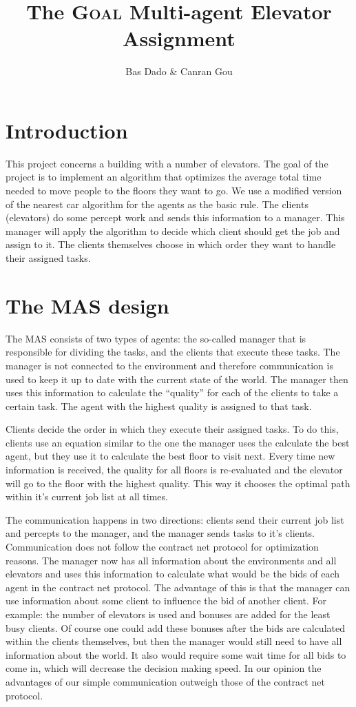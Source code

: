 \documentclass[a4paper,10pt,twocolumn]{article}
\title{The \textsc{Goal} Multi-agent Elevator Assignment}
\author{Bas Dado \& Canran Gou}
\begin{document}
\maketitle

\section{Introduction}
This project concerns a building with a number of elevators. The goal of the project is to implement an algorithm that optimizes the average total time needed to move people to the floors they want to go. We use a modified version of the nearest car algorithm for the agents as the basic rule. The clients (elevators) do some percept work and sends this information to a manager. This manager will apply the algorithm to decide which client should get the job and assign to it.
The clients themselves choose in which order they want to handle their assigned tasks.

\section{The MAS design}
The MAS consists of two types of agents: the so-called manager that is responsible for dividing the tasks, and the clients that execute these tasks. The manager is not connected to the environment and therefore communication is used to keep it up to date with the current state of the world. The manager then uses this information  to calculate the ``quality'' for each of the clients to take a certain task. The agent with the highest quality is assigned to that task. 

Clients decide the order in which they execute their assigned tasks. To do this, clients use an equation similar to the one the manager uses the calculate the best agent, but they use it to calculate the best floor to visit next. Every time new information is received, the quality for all floors is re-evaluated and the elevator will go to the floor with the highest quality. This way it chooses the optimal path within it's current job list at all times.

The communication happens in two directions: clients send their current job list and percepts to the manager, and the manager sends tasks to it's clients. Communication does not follow the contract net protocol for optimization reasons. The manager now has all information about the environments and all elevators and uses this information to calculate what would be the bids of each agent in the contract net protocol. The advantage of this is that the manager can use information about some client to influence the bid of another client. For example: the number of elevators is used and bonuses are added for the least busy clients. Of course one could add these bonuses after the bids are calculated within the clients themselves, but then the manager would still need to have all information about the world. It also would require some wait time for all bids to come in, which will decrease the decision making speed. In our opinion the advantages of our simple communication outweigh those of the contract net protocol.
\end{document}
